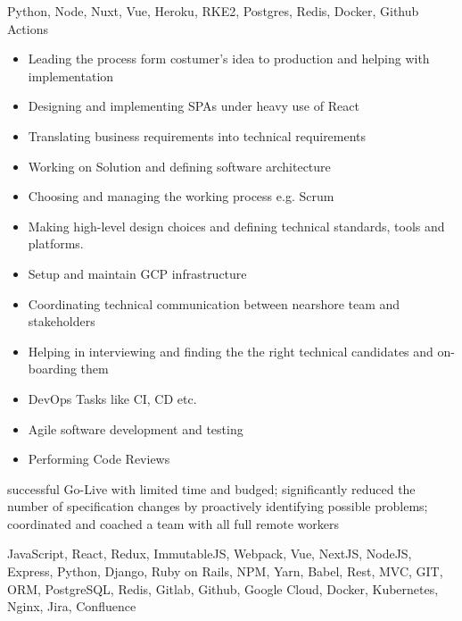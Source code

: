 \documentclass[9pt,a4paper]{altacv}
\begin{document}
Python, Node, Nuxt, Vue, Heroku, RKE2, Postgres, Redis, Docker, Github Actions



\newpage
{}%

%


\begin{itemize}
\item Leading the process form costumer's idea to production and helping with implementation
\item Designing and implementing SPAs under heavy use of React
\item Translating business requirements into technical requirements
\item Working on Solution and defining software architecture
\item Choosing and managing the working process e.g. Scrum
\item Making high-level design choices and defining technical standards, tools and platforms.
\item Setup and maintain GCP infrastructure
\item Coordinating technical communication between nearshore team and stakeholders
\item Helping in interviewing and finding the the right technical candidates and on-boarding them
\item DevOps Tasks like CI, CD etc.
\item Agile software development and testing
\item Performing Code Reviews
\end{itemize}

successful Go-Live with limited time and budged;
significantly reduced the number of specification changes by proactively identifying possible problems;
coordinated and coached a team with all full remote workers

JavaScript, React, Redux, ImmutableJS, Webpack, Vue, NextJS, NodeJS, Express,
Python, Django, Ruby on Rails, NPM, Yarn, Babel,
Rest, MVC, GIT, ORM, PostgreSQL, Redis,
Gitlab, Github, Google Cloud, Docker, Kubernetes, Nginx,
Jira, Confluence
\end{document}
